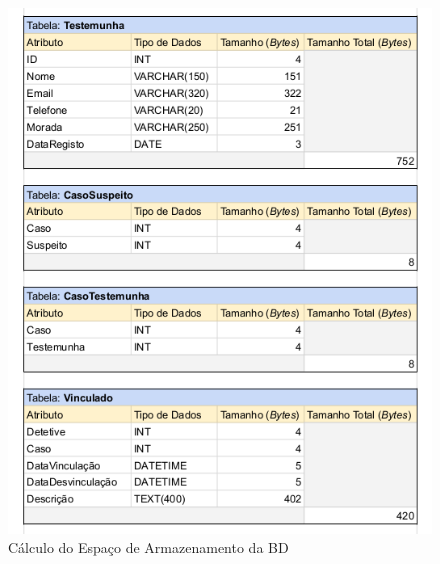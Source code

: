 \documentclass[a4paper,12pt]{scrreprt}
\begin{document}
\begin{figure}[!ht]
    \centering
    \includegraphics[scale=0.83]{images/armazenamento/4.png}
    \caption{Cálculo do Espaço de Armazenamento da BD}
    \label{fig:5.4}
\end{figure}
\end{document}
